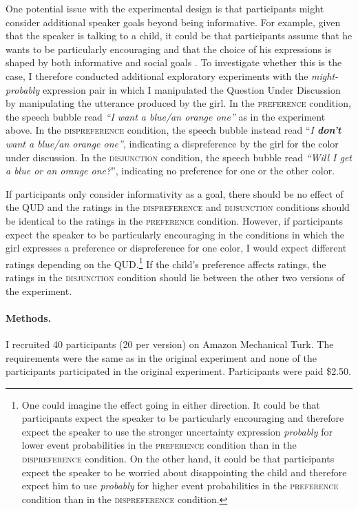 One potential issue with the experimental design is that participants might consider additional speaker goals
beyond being informative. For example, given that the speaker is talking to a child, it could be that participants
assume that he wants to be particularly encouraging and that the choice of his expressions is shaped by both informative
and social goals \cite{Yoon2018}. To investigate whether this is the case, I therefore conducted additional exploratory experiments with
the \emph{might-probably} expression pair in which I manipulated the Question Under Discussion \parencite[QUD;][]{Roberts2012} by manipulating 
the utterance produced by the girl. In the \textsc{preference} condition, the speech bubble read \emph{``I want a blue/an orange one''} as in the experiment
above. In the \textsc{dispreference} condition, the speech bubble instead read ``\emph{I \textbf{don't} want a blue/an orange one''}, indicating
a dispreference by the girl for the color under discussion. In the \textsc{disjunction} condition, the speech bubble read 
\emph{``Will I get a blue or an orange one?}'', indicating no preference for one or the other color. 

If participants only consider informativity as a goal, there should be no effect of the QUD and the ratings in the 
\textsc{dispreference} and \textsc{dijsunction} conditions should be identical to the ratings 
in the \textsc{preference} condition. However, if participants expect the speaker to be particularly encouraging in the 
conditions in which the girl expresses a preference or dispreference for one color, I would expect different
ratings depending on the QUD.\footnote{One could imagine the effect going in either direction. It could be that
participants expect the speaker to be particularly encouraging and therefore expect the speaker to use 
the stronger uncertainty expression \textit{probably} for lower event probabilities in the \textsc{preference} condition than 
in the \textsc{dispreference} condition. On the other hand, it could be that participants expect the speaker to be worried about 
disappointing the child and therefore expect him to use \textit{probably} for higher event probabilities in the \textsc{preference} 
condition than in the \textsc{dispreference} condition.} If the child's preference affects ratings, the ratings in the  
\textsc{disjunction} condition should lie between the other two versions of the experiment.

\paragraph{Methods.} I recruited 40 participants (20 per version) on Amazon Mechanical Turk. 
The requirements were the same as in the original experiment and none of the participants 
participated in the original experiment. Participants were paid  \$2.50.

